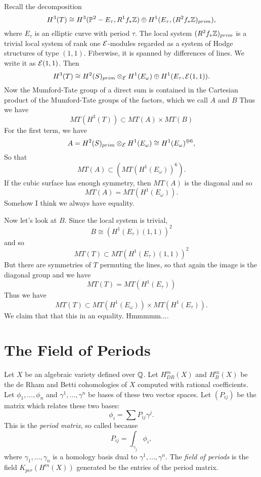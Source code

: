 \documentclass[11pt]{amsart}
\begin{document}
Recall the decomposition
\[ 
   H^3(T) \cong H^3({\mathbb P}^2 - E_\tau, R^1f_* {\mathbb Z}) \oplus H^1(E_\tau, (R^2f_*{\mathbb Z})_{prim}),
\]
where $E_\tau$ is an elliptic curve with period $\tau$.
The local system $(R^2f_*{\mathbb Z})_{prim}$ is a trivial local system of rank one ${\mathcal E}$-modules regarded
as a system of Hodge structures of type $(1,1)$.  Fiberwise, it is spanned by differences of lines.  We write it as ${\mathcal E}(1,1)$.  Then
\[
  H^3(T) \cong H^2(S)_{prim} \otimes_{\mathcal E} H^1(E_\omega)
  \oplus H^1(E_\tau,{\mathcal E}(1,1)).
\]
Now the Mumford-Tate group of a direct sum is contained in the Cartesian product of the Mumford-Tate groups of the factors, which we call $A$ and $B$  Thus we have
\[
    MT(   H^3(T)   ) 
       \subset 
     MT(  A  ) 
        \times 
     MT(  B )
\]
For the first term, we have
\[
  A = H^2(S)_{prim} \otimes_{\mathcal E} H^1(E_\omega) \cong H^1(E_\omega) ^{\oplus 6},
\]
So that 
\[
    MT(A) \subset (MT(H^1(E_\omega))^6).
\]
If the cubic surface has enough symmetry, then $MT(A)$ is the diagonal and so
\[
    MT(A) = MT(H^1(E_\omega)).
\]
Somehow I think we always have equality.

Now let's look at $B$.  Since the local system is trivial,
\[
   B \cong (H^1(E_\tau)(1,1))^2
\]
and so 
\[
   MT(T) \subset MT(H^1(E_\tau)(1,1))^2
\]
But there are symmetries of $T$ permuting the lines, so that again
the image is the diagonal group and we have
\[
   MT(T) = MT(H^1(E_\tau))
\]
Thus we have
\[
  MT(T) \subset MT(H^1(E_\omega)) \times MT(H^1(E_\tau)).
\]
We claim that that this in an equality.   Hmmmmm....





\section{The Field of Periods}

Let $X$ be an algebraic variety defined over ${\mathbb Q}$.  Let $H^m_{DR}(X)$ and $H^m_B(X)$
be the de Rham and Betti cohomologies of $X$ computed with rational coefficients.
Let $\phi_1, \ldots, \phi_n$ and $\gamma^1, \ldots, \gamma^n$ be bases of these two vector spaces.
Let  $(P_{ij})$ be the matrix which relates these two bases:
\[
     \phi_i  = \sum P_{ij}\gamma^j.
\]
This is the \emph{period matrix}, so called because
\[
    P_{ij} = \int_{\gamma_j}\phi_i,
\]
where $\gamma_1, \ldots, \gamma_n$ is a homology basis dual to $\gamma^1, \ldots, \gamma^n$.
The \emph{field of periods} is the field $K_{per}(H^m(X))$ generated be the entries of the period matrix.
\end{document}
